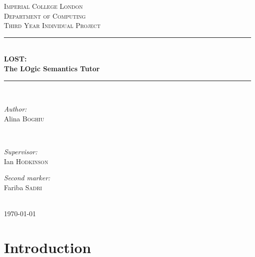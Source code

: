 \documentclass{article}
\begin{document}

\begin{titlepage}
\newcommand{\HRule}{\rule{\linewidth}{0.5mm}}
\center
\textsc{\LARGE Imperial College London}  \\[1.5cm]
\textsc{\Large Department of Computing}  \\[0.5cm]
\textsc{\large Third Year Individual Project} \\[0.5cm]

\HRule \\[0.6cm]
{\huge \bfseries LOST: \\The LOgic Semantics Tutor} \\[0.3cm]
\HRule \\[1.5cm]

\begin{minipage}{0.4\textwidth}

\begin{flushleft} \large \emph{Author:} \\
Alina  \textsc{Boghiu}
\end{flushleft}

\end{minipage}~
\begin{minipage}{0.4\textwidth}

\begin{flushright} \large \emph{Supervisor:} \\
Ian \textsc{Hodkinson}
\end{flushright}

\begin{flushright} \large \emph{Second marker:} \\
Fariba \textsc{Sadri}
\end{flushright}

\end{minipage}\\[4cm]

{\large \today}\\[3cm]
\vfill
\end{titlepage}


\section{Introduction}		%
\end{document}
